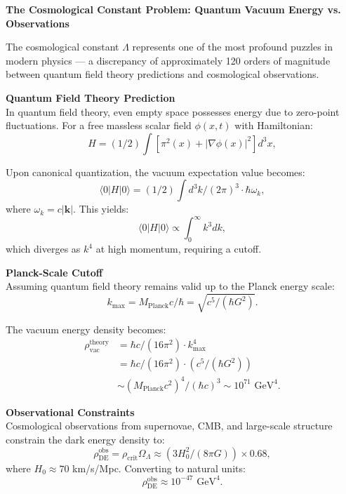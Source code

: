\begin{technical}
{\Large\textbf{The Cosmological Constant Problem: Quantum Vacuum Energy vs. Observations}}

The cosmological constant $\Lambda$ represents one of the most profound puzzles in modern physics — a discrepancy of approximately 120 orders of magnitude between quantum field theory predictions and cosmological observations.

\medskip

\noindent\textbf{Quantum Field Theory Prediction}\\
In quantum field theory, even empty space possesses energy due to zero-point fluctuations. For a free massless scalar field $\phi(x,t)$ with Hamiltonian:
\begin{equation}
H = (1/2) \int \left[ \pi^2(x) + |\nabla \phi(x)|^2 \right] d^3x,
\end{equation}

Upon canonical quantization, the vacuum expectation value becomes:
\begin{equation}
\langle 0 | H | 0 \rangle = (1/2) \int d^3k/(2\pi)^3 \cdot \hbar\omega_k,
\end{equation}
where $\omega_k = c|\mathbf{k}|$. This yields:
\begin{equation}
\langle 0 | H | 0 \rangle \propto \int_0^\infty k^3 dk,
\end{equation}
which diverges as $k^4$ at high momentum, requiring a cutoff.

\medskip

\noindent\textbf{Planck-Scale Cutoff}\\
Assuming quantum field theory remains valid up to the Planck energy scale:
\begin{equation}
k_{\max} = M_{\text{Planck}} c/\hbar = \sqrt{c^5/(\hbar G^2)}.
\end{equation}

The vacuum energy density becomes:
\begin{align}
\rho_{\text{vac}}^{\text{theory}} &= \hbar c/(16\pi^2) \cdot k_{\max}^4 \\
&= \hbar c/(16\pi^2) \cdot (c^5/(\hbar G^2)) \\
&\sim (M_{\text{Planck}} c^2)^4/(\hbar c)^3 \sim 10^{71} \text{ GeV}^4.
\end{align}

\medskip

\noindent\textbf{Observational Constraints}\\
Cosmological observations from supernovae, CMB, and large-scale structure constrain the dark energy density to:
\begin{equation}
\rho_{\text{DE}}^{\text{obs}} = \rho_{\text{crit}} \Omega_\Lambda \approx (3H_0^2/(8\pi G)) \times 0.68,
\end{equation}
where $H_0 \approx 70$ km/s/Mpc. Converting to natural units:
\begin{equation}
\rho_{\text{DE}}^{\text{obs}} \approx 10^{-47} \text{ GeV}^4.
\end{equation}


\end{technical}
